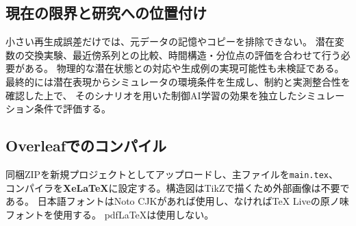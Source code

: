 \documentclass[a4paper,10pt]{article}
\begin{document}
\subsection{現在の限界と研究への位置付け}
小さい再生成誤差だけでは、元データの記憶やコピーを排除できない。
潜在変数の交換実験、最近傍系列との比較、時間構造・分位点の評価を合わせて行う必要がある。
物理的な潜在状態との対応や生成例の実現可能性も未検証である。
最終的には潜在表現からシミュレータの環境条件を生成し、制約と実測整合性を確認した上で、
そのシナリオを用いた制御AI学習の効果を独立したシミュレーション条件で評価する。

\subsection{Overleafでのコンパイル}
同梱ZIPを新規プロジェクトとしてアップロードし、主ファイルを\texttt{main.tex}、
コンパイラを\textbf{XeLaTeX}に設定する。構造図はTikZで描くため外部画像は不要である。
日本語フォントはNoto CJKがあれば使用し、なければTeX Liveの原ノ味フォントを使用する。
pdfLaTeXは使用しない。
\end{document}
